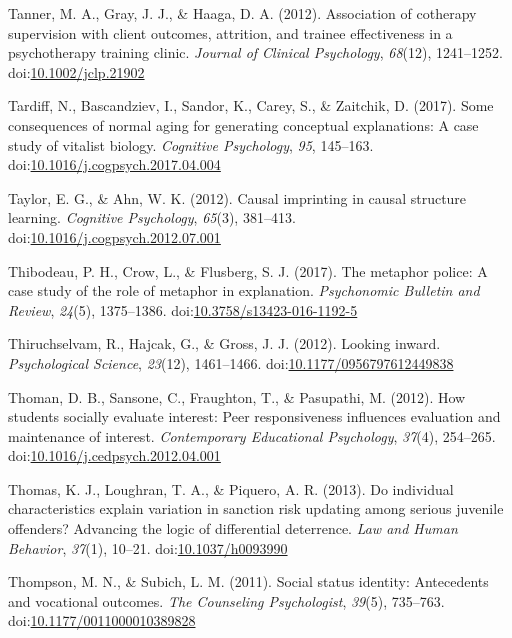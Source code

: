 \documentclass[english,man]{apa6}
\theoremstyle{definition}
\theoremstyle{definition}
\theoremstyle{definition}
\theoremstyle{remark}
\begin{document}
\hypertarget{ref-Tanner2012}{}
Tanner, M. A., Gray, J. J., \& Haaga, D. A. (2012). Association of
cotherapy supervision with client outcomes, attrition, and trainee
effectiveness in a psychotherapy training clinic. \emph{Journal of
Clinical Psychology}, \emph{68}(12), 1241--1252.
doi:\href{https://doi.org/10.1002/jclp.21902}{10.1002/jclp.21902}

\hypertarget{ref-Tardiff2017}{}
Tardiff, N., Bascandziev, I., Sandor, K., Carey, S., \& Zaitchik, D.
(2017). Some consequences of normal aging for generating conceptual
explanations: A case study of vitalist biology. \emph{Cognitive
Psychology}, \emph{95}, 145--163.
doi:\href{https://doi.org/10.1016/j.cogpsych.2017.04.004}{10.1016/j.cogpsych.2017.04.004}

\hypertarget{ref-Taylor2012}{}
Taylor, E. G., \& Ahn, W. K. (2012). Causal imprinting in causal
structure learning. \emph{Cognitive Psychology}, \emph{65}(3), 381--413.
doi:\href{https://doi.org/10.1016/j.cogpsych.2012.07.001}{10.1016/j.cogpsych.2012.07.001}

\hypertarget{ref-Thibodeau2017}{}
Thibodeau, P. H., Crow, L., \& Flusberg, S. J. (2017). The metaphor
police: A case study of the role of metaphor in explanation.
\emph{Psychonomic Bulletin and Review}, \emph{24}(5), 1375--1386.
doi:\href{https://doi.org/10.3758/s13423-016-1192-5}{10.3758/s13423-016-1192-5}

\hypertarget{ref-Thiruchselvam2012}{}
Thiruchselvam, R., Hajcak, G., \& Gross, J. J. (2012). Looking inward.
\emph{Psychological Science}, \emph{23}(12), 1461--1466.
doi:\href{https://doi.org/10.1177/0956797612449838}{10.1177/0956797612449838}

\hypertarget{ref-Thoman2012}{}
Thoman, D. B., Sansone, C., Fraughton, T., \& Pasupathi, M. (2012). How
students socially evaluate interest: Peer responsiveness influences
evaluation and maintenance of interest. \emph{Contemporary Educational
Psychology}, \emph{37}(4), 254--265.
doi:\href{https://doi.org/10.1016/j.cedpsych.2012.04.001}{10.1016/j.cedpsych.2012.04.001}

\hypertarget{ref-Thomas2013}{}
Thomas, K. J., Loughran, T. A., \& Piquero, A. R. (2013). Do individual
characteristics explain variation in sanction risk updating among
serious juvenile offenders? Advancing the logic of differential
deterrence. \emph{Law and Human Behavior}, \emph{37}(1), 10--21.
doi:\href{https://doi.org/10.1037/h0093990}{10.1037/h0093990}

\hypertarget{ref-Thompson2011}{}
Thompson, M. N., \& Subich, L. M. (2011). Social status identity:
Antecedents and vocational outcomes. \emph{The Counseling Psychologist},
\emph{39}(5), 735--763.
doi:\href{https://doi.org/10.1177/0011000010389828}{10.1177/0011000010389828}
\end{document}
